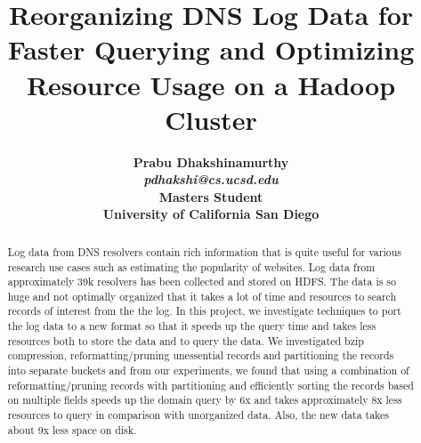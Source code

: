 \documentclass[11pt,a4paper]{article}
\begin{document}
\title{\bf Reorganizing DNS Log Data for Faster Querying and Optimizing Resource Usage on a Hadoop Cluster}
\author{
	\bf Prabu Dhakshinamurthy\\
	\textit{pdhakshi@cs.ucsd.edu}\\
	Masters Student\\
	University of California San Diego
}
\date {}
\maketitle

\begin{abstract} 
\noindent
Log data from DNS resolvers contain rich information that is quite useful for various research use cases such as estimating the popularity of websites. Log data from approximately 39k resolvers has been collected and stored on HDFS. The data is so huge and not optimally organized that it takes a lot of time and resources to search records of interest from the the log. In this project, we investigate techniques to port the log data to a new format so that it speeds up the query time and takes less resources both to store the data and to query the data. We investigated bzip compression, reformatting/pruning unessential records and partitioning the records into separate buckets and from our experiments, we found that using a combination of reformatting/pruning records with partitioning and efficiently sorting the records based on multiple fields speeds up the domain query by 6x and takes approximately 8x less resources to query in comparison with unorganized data. Also, the new data takes about 9x less space on disk.
\end{abstract} 
\end{document}
